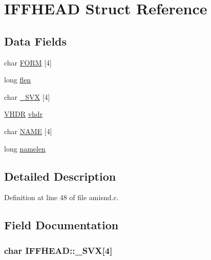 \hypertarget{structIFFHEAD}{\section{I\+F\+F\+H\+E\+A\+D Struct Reference}
\label{structIFFHEAD}
}
\subsection*{Data Fields}
\begin{DoxyCompactItemize}
\item 
char \hyperlink{structIFFHEAD_a1e1a5d0068bed540b3b6e9fadd317847}{F\+O\+R\+M} \mbox{[}4\mbox{]}
\item 
long \hyperlink{structIFFHEAD_a5c34244e80a2c81e1096c809363a6b7b}{flen}
\item 
char \hyperlink{structIFFHEAD_a773ae72f0d64fefa590aa76c13718037}{\+\_\+S\+V\+X} \mbox{[}4\mbox{]}
\item 
\hyperlink{structVHDR}{V\+H\+D\+R} \hyperlink{structIFFHEAD_a8382422ffd2bc6f1b004216fc140b9b5}{vhdr}
\item 
char \hyperlink{structIFFHEAD_ad97eaa6fc9bd846b458123b6aa216417}{N\+A\+M\+E} \mbox{[}4\mbox{]}
\item 
long \hyperlink{structIFFHEAD_acc3ec2069100de25d0d5f5c769828a0c}{namelen}
\end{DoxyCompactItemize}


\subsection{Detailed Description}


Definition at line 48 of file amisnd.\+c.



\subsection{Field Documentation}
\hypertarget{structIFFHEAD_a773ae72f0d64fefa590aa76c13718037}{
\subsubsection[{\+\_\+8\+S\+V\+X}]{\setlength{\rightskip}{0pt plus 5cm}char I\+F\+F\+H\+E\+A\+D\+::\+\_\+S\+V\+X\mbox{[}4\mbox{]}}}\label{structIFFHEAD_a773ae72f0d64fefa590aa76c13718037}


